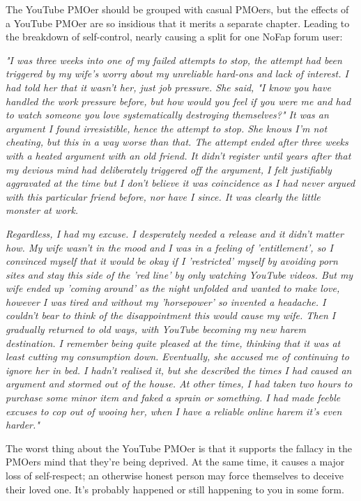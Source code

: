 \documentclass[easypeasy.tex]{subfiles}
\begin{document}
The YouTube PMOer should be grouped with casual PMOers, but the effects of a YouTube PMOer are so insidious that it merits a separate chapter. Leading to the breakdown of self-control, nearly causing a split for one NoFap forum user:

\textit{"I was three weeks into one of my failed attempts to stop, the attempt had been triggered by my wife's worry about my unreliable hard-ons and lack of interest. I had told her that it wasn't her, just job pressure. She said, "I know you have handled the work pressure before, but how would you feel if you were me and had to watch someone you love systematically destroying themselves?" It was an argument I found irresistible, hence the attempt to stop. She knows I'm not cheating, but this in a way worse than that. The attempt ended after three weeks with a heated argument with an old friend. It didn't register until years after that my devious mind had deliberately triggered off the argument, I felt justifiably aggravated at the time but I don't believe it was coincidence as I had never argued with this particular friend before, nor have I since. It was clearly the little monster at work.}

\textit{Regardless, I had my excuse. I desperately needed a release and it didn't matter how. My wife wasn't in the mood and I was in a feeling of 'entitlement', so I convinced myself that it would be okay if I 'restricted' myself by avoiding porn sites and stay this side of the 'red line' by only watching YouTube videos. But my wife ended up 'coming around' as the night unfolded and wanted to make love, however I was tired and without my 'horsepower' so invented a headache. I couldn't bear to think of the disappointment this would cause my wife. Then I gradually returned to old ways, with YouTube becoming my new harem destination. I remember being quite pleased at the time, thinking that it was at least cutting my consumption down. Eventually, she accused me of continuing to ignore her in bed. I hadn't realised it, but she described the times I had caused an argument and stormed out of the house. At other times, I had taken two hours to purchase some minor item and faked a sprain or something. I had made feeble excuses to cop out of wooing her, when I have a reliable online harem it's even harder."}

The worst thing about the YouTube PMOer is that it supports the fallacy in the PMOers mind that they're being deprived. At the same time, it causes a major loss of self-respect; an otherwise honest person may force themselves to deceive their loved one. It's probably happened or still happening to you in some form.
\end{document}
